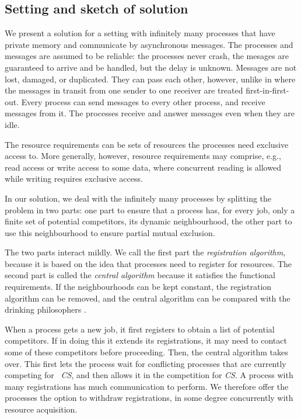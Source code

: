 \documentclass[10pt]{article} \usepackage[english]{babel}
\def\S #1/{\mbox {\textsl{#1}}}
\begin{document}
\subsection{Setting and sketch of solution}

We present a solution for a setting with infinitely many processes
that have private memory and communicate by asynchronous messages.
The processes and messages are assumed to be reliable: the processes
never crash, the mesages are guaranteed to arrive and be handled, but
the delay is unknown.  Messages are not lost, damaged, or duplicated.
They can pass each other, however, unlike in \cite{AwS90,Lyn96} where
the messages in transit from one sender to one receiver are treated
first-in-first-out.  Every process can send messages to every other
process, and receive messages from it.  The processes receive and
answer messages even when they are idle.

The resource requirements can be sets of resources the processes need
exclusive access to.  More generally, however, resource requirements
may comprise, e.g., read access or write access to some data, where
concurrent reading is allowed while writing requires exclusive access.

In our solution, we deal with the infinitely many processes by
splitting the problem in two parts: one part to ensure that a process
has, for every job, only a finite set of potential competitors, its
dynamic neighbourhood, the other part to use this neighbourhood to
ensure partial mutual exclusion.

The two parts interact mildly.  We call the first part the
\emph{registration algorithm}, because it is based on the idea that
processes need to register for resources.  The second part is called
the \emph{central algorithm} because it satisfies the functional
requirements.  If the neighbourhoods can be kept constant, the
registration algorithm can be removed, and the central algorithm can
be compared with the drinking philosophers \cite{ChM84}.

When a process gets a new job, it first registers to obtain a list of
potential competitors.  If in doing this it extends its registrations,
it may need to contact some of these competitors before proceeding.
Then, the central algorithm takes over.  This first lets the process
wait for conflicting processes that are currently competing for \S
CS/, and then allows it in the competition for \S CS/.  A process with
many registrations has much communication to perform.  We therefore
offer the processes the option to withdraw registrations, in some
degree concurrently with resource acquisition.
\end{document}
